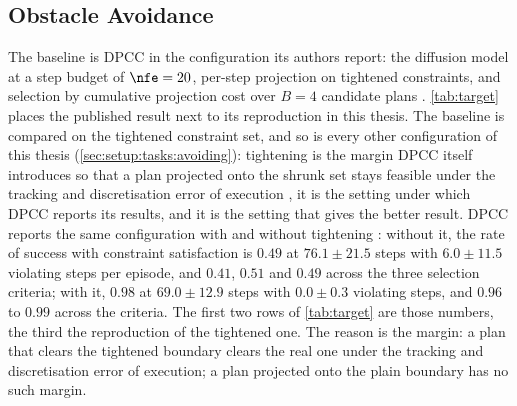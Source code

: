 \subsection{Obstacle Avoidance}\label{sec:setup:baselines:avoiding}

The baseline is \ac{DPCC} in the configuration its authors report: the diffusion model at a step budget
of $\nfe=20$, per-step projection on tightened constraints, and selection by
cumulative projection cost over $B=4$ candidate plans \parencite[Sec.~6.1]{romer2025diffusion}.
\autoref{tab:target} places the published result next to its reproduction in this thesis. The baseline is
compared on the tightened constraint set, and so is every other configuration of this thesis
(\autoref{sec:setup:tasks:avoiding}): tightening is the margin \ac{DPCC} itself introduces so that a plan
projected onto the shrunk set stays feasible under the tracking and discretisation error of execution
\parencite[Sec.~5.3]{romer2025diffusion}, it is the setting under which \ac{DPCC} reports its results, and it
is the setting that gives the better result. \ac{DPCC} reports the same configuration with and without
tightening \parencite[Table~1 and Fig.~2]{romer2025diffusion}: without it, the rate of success with
constraint satisfaction is $0.49$ at $76.1\pm21.5$ steps with $6.0\pm11.5$ violating steps per episode,
and $0.41$, $0.51$ and $0.49$ across the three selection criteria; with it, $0.98$ at $69.0\pm12.9$ steps
with $0.0\pm0.3$ violating steps, and $0.96$ to $0.99$ across the criteria. The first two rows of
\autoref{tab:target} are those numbers, the third the reproduction of the tightened one. The
reason is the margin: a plan that clears the tightened boundary clears the real one under the tracking
and discretisation error of execution; a plan projected onto the plain boundary has no such margin.

